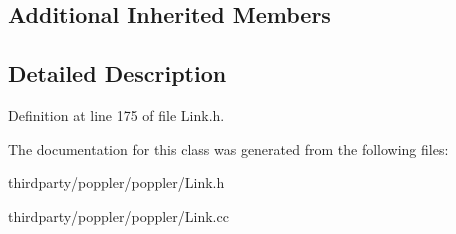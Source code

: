 \subsection*{Additional Inherited Members}


\subsection{Detailed Description}


Definition at line 175 of file Link.\+h.



The documentation for this class was generated from the following files\+:\begin{DoxyCompactItemize}
\item 
thirdparty/poppler/poppler/Link.\+h\item 
thirdparty/poppler/poppler/Link.\+cc\end{DoxyCompactItemize}
